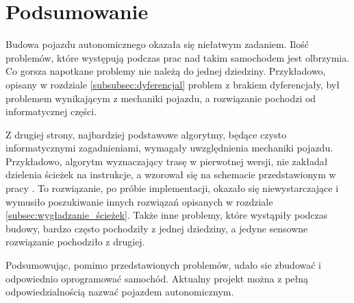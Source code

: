 \section{Podsumowanie}
    Budowa pojazdu autonomicznego okazała się niełatwym zadaniem.
    Ilość problemów, które występują podczas prac nad takim samochodem jest olbrzymia.
    Co gorsza napotkane problemy nie należą do jednej dziedziny.
    Przykładowo, opisany w rozdziale \ref{subsubsec:dyferencjal} problem z brakiem dyferencjały, był problemem wynikającym z mechaniki pojazdu, a rozwiązanie pochodzi od informatycznej części.

    Z drugiej strony, najbardziej podstawowe algorytmy, będące czysto informatycznymi zagadnieniami, wymagały uwzględnienia mechaniki pojazdu.
    Przykładowo, algorytm wyznaczający trasę w pierwotnej wersji, nie zakładał dzielenia ścieżek na instrukcje, a wzorował się na schemacie przedstawionym w pracy \cite{Simple_PathSmoothing}.
    To rozwiązanie, po próbie implementacji, okazało się niewystarczające i wymusiło poszukiwanie innych rozwiązań opisanych w rozdziale \ref{subsec:wygładzanie_ścieżek}.
    Także inne problemy, które wystąpiły podczas budowy, bardzo często pochodziły z jednej dziedziny, a jedyne sensowne rozwiązanie pochodziło z drugiej.

    Podsumowując, pomimo przedstawionych problemów, udało sie zbudować i odpowiednio oprogramować samochód.
    Aktualny projekt można z pełną odpowiedzialnością nazwać pojazdem autonomicznym.

